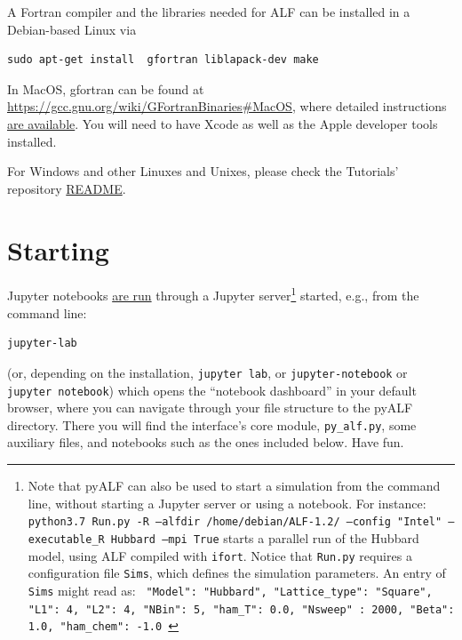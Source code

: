 \documentclass[10pt,modern]{scrartcl}
\numberwithin{exerciseitem}{exercise} %
\newcommand{\ALFver}{2.3}          %
\newcommand{\tutALFver}{2.3}       %
\begin{document}
A Fortran compiler and the libraries needed for ALF can be installed in a Debian-based Linux via
\begin{lstlisting}[style=bash]
sudo apt-get install  gfortran liblapack-dev make
\end{lstlisting}
In MacOS, gfortran can be found at \url{https://gcc.gnu.org/wiki/GFortranBinaries#MacOS}, where detailed instructions \href{https://gcc.gnu.org/wiki/GFortranBinariesMacOS}{are available}. You will need to have Xcode as well as the Apple developer tools installed.

For Windows and other Linuxes and Unixes, please check the Tutorials' repository \href{https://git.physik.uni-wuerzburg.de/ALF/ALF_Tutorial/-/blob/master/Tutorial-ALF-\tutALFver/README.md}{README}.

\section*{Starting}

Jupyter notebooks \href{https://jupyter.readthedocs.io/en/latest/running.html}{are run} through a Jupyter server\footnote{Note that pyALF can also be used to start a simulation from the command line, without starting a Jupyter server or using a notebook. For instance: \texttt{python3.7 Run.py -R  --alfdir /home/debian/ALF-1.2/ --config "Intel"  --executable\_R Hubbard --mpi True} starts a parallel run of the Hubbard model, using ALF compiled with \texttt{ifort}.  Notice that \texttt{Run.py} requires a configuration file  \texttt{Sims}, which defines the simulation parameters. An entry of \texttt{Sims} might read as: \texttt{ {"Model": "Hubbard", "Lattice\_type": "Square", "L1": 4, "L2": 4, "NBin": 5, "ham\_T": 0.0, "Nsweep" : 2000, "Beta": 1.0, "ham\_chem": -1.0} } } started, e.g., from the command line:
\begin{lstlisting}[style=bash]
jupyter-lab
\end{lstlisting}
(or, depending on the installation, \texttt{jupyter lab}, or \texttt{jupyter-notebook} or \texttt{jupyter notebook})
which opens the ``notebook dashboard'' in your default browser, where you can navigate through your file structure to the pyALF directory. There you will find the interface's core module, \texttt{py\_alf.py}, some auxiliary files, and notebooks such as the ones included below. Have fun. 
\end{document}
